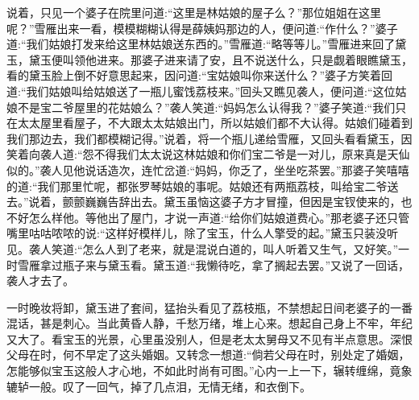 \begin{parag}
    说着，只见一个婆子在院里问道:“这里是林姑娘的屋子么？”那位姐姐在这里呢？”雪雁出来一看，模模糊糊认得是薛姨妈那边的人，便问道:“作什么？”婆子道:“我们姑娘打发来给这里林姑娘送东西的。”雪雁道:“略等等儿。”雪雁进来回了黛玉，黛玉便叫领他进来。那婆子进来请了安，且不说送什么，只是觑着眼瞧黛玉，看的黛玉脸上倒不好意思起来，因问道:“宝姑娘叫你来送什么？”婆子方笑着回道:“我们姑娘叫给姑娘送了一瓶儿蜜饯荔枝来。”回头又瞧见袭人，便问道:“这位姑娘不是宝二爷屋里的花姑娘么？”袭人笑道:“妈妈怎么认得我？”婆子笑道:“我们只在太太屋里看屋子，不大跟太太姑娘出门，所以姑娘们都不大认得。姑娘们碰着到我们那边去，我们都模糊记得。”说着，将一个瓶儿递给雪雁，又回头看看黛玉，因笑着向袭人道:“怨不得我们太太说这林姑娘和你们宝二爷是一对儿，原来真是天仙似的。”袭人见他说话造次，连忙岔道:“妈妈，你乏了，坐坐吃茶罢。”那婆子笑嘻嘻的道:“我们那里忙呢，都张罗琴姑娘的事呢。姑娘还有两瓶荔枝，叫给宝二爷送去。”说着，颤颤巍巍告辞出去。黛玉虽恼这婆子方才冒撞，但因是宝钗使来的，也不好怎么样他。等他出了屋门，才说一声道:“给你们姑娘道费心。”那老婆子还只管嘴里咕咕哝哝的说:“这样好模样儿，除了宝玉，什么人擎受的起。”黛玉只装没听见。袭人笑道:“怎么人到了老来，就是混说白道的，叫人听着又生气，又好笑。”一时雪雁拿过瓶子来与黛玉看。黛玉道:“我懒待吃，拿了搁起去罢。”又说了一回话，袭人才去了。
\end{parag}


\begin{parag}
    一时晚妆将卸，黛玉进了套间，猛抬头看见了荔枝瓶，不禁想起日间老婆子的一番混话，甚是刺心。当此黄昏人静，千愁万绪，堆上心来。想起自己身上不牢，年纪又大了。看宝玉的光景，心里虽没别人，但是老太太舅母又不见有半点意思。深恨父母在时，何不早定了这头婚姻。又转念一想道:“倘若父母在时，别处定了婚姻，怎能够似宝玉这般人才心地，不如此时尚有可图。”心内一上一下，辗转缠绵，竟象辘轳一般。叹了一回气，掉了几点泪，无情无绪，和衣倒下。
\end{parag}


